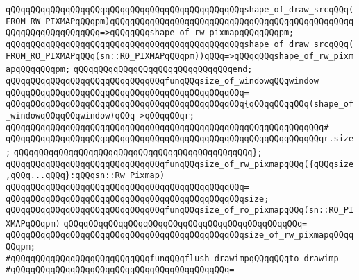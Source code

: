 \verb|qQQqqQQqqQQqqQQqqQQqqQQqqQQqqQQqqQQqqQQqqQQqqQQqshape_of_draw_srcqQQq(FROM_RW_PIXMAPqQQqpm)qQQqqQQqqQQqqQQqqQQqqQQqqQQqqQQqqQQqqQQqqQQqqQQqqQQqqQQqqQQqqQQqqQQq=>qQQqqQQqshape_of_rw_pixmapqQQqqQQqpm;|\newline
\verb|qQQqqQQqqQQqqQQqqQQqqQQqqQQqqQQqqQQqqQQqqQQqqQQqshape_of_draw_srcqQQq(FROM_RO_PIXMAPqQQq(sn::RO_PIXMAPqQQqpm))qQQq=>qQQqqQQqshape_of_rw_pixmapqQQqqQQqpm;|\newline
\verb|qQQqqQQqqQQqqQQqqQQqqQQqqQQqqQQqend;|\newline
\newline
\newline
\verb|qQQqqQQqqQQqqQQqqQQqqQQqqQQqqQQqfunqQQqsize_of_windowqQQqwindow|\newline
\verb|qQQqqQQqqQQqqQQqqQQqqQQqqQQqqQQqqQQqqQQqqQQqqQQq=|\newline
\verb|qQQqqQQqqQQqqQQqqQQqqQQqqQQqqQQqqQQqqQQqqQQqqQQq{qQQqqQQqqQQq(shape_of_windowqQQqqQQqwindow)qQQq->qQQqqQQqr;|\newline
\verb|qQQqqQQqqQQqqQQqqQQqqQQqqQQqqQQqqQQqqQQqqQQqqQQqqQQqqQQqqQQqqQQq#|\newline
\verb|qQQqqQQqqQQqqQQqqQQqqQQqqQQqqQQqqQQqqQQqqQQqqQQqqQQqqQQqqQQqqQQqr.size;|\newline
\verb|qQQqqQQqqQQqqQQqqQQqqQQqqQQqqQQqqQQqqQQqqQQqqQQq};|\newline
\newline
\newline
\verb|qQQqqQQqqQQqqQQqqQQqqQQqqQQqqQQqfunqQQqsize_of_rw_pixmapqQQq({qQQqsize,qQQq...qQQq}:qQQqsn::Rw_Pixmap)|\newline
\verb|qQQqqQQqqQQqqQQqqQQqqQQqqQQqqQQqqQQqqQQqqQQqqQQq=|\newline
\verb|qQQqqQQqqQQqqQQqqQQqqQQqqQQqqQQqqQQqqQQqqQQqqQQqsize;|\newline
\newline
\newline
\verb|qQQqqQQqqQQqqQQqqQQqqQQqqQQqqQQqfunqQQqsize_of_ro_pixmapqQQq(sn::RO_PIXMAPqQQqpm)|\newline
\verb|qQQqqQQqqQQqqQQqqQQqqQQqqQQqqQQqqQQqqQQqqQQqqQQq=|\newline
\verb|qQQqqQQqqQQqqQQqqQQqqQQqqQQqqQQqqQQqqQQqqQQqqQQqsize_of_rw_pixmapqQQqqQQqpm;|\newline
\newline
\newline
\verb|#qQQqqQQqqQQqqQQqqQQqqQQqqQQqfunqQQqflush_drawimpqQQqqQQqto_drawimp|\newline
\verb|#qQQqqQQqqQQqqQQqqQQqqQQqqQQqqQQqqQQqqQQqqQQq=|\newline
